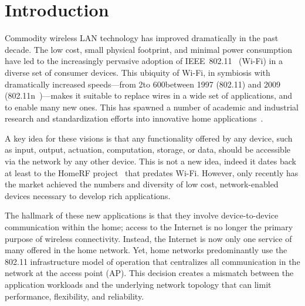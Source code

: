 \section{Introduction}
\label{sec:intro}

Commodity wireless LAN technology has improved dramatically in the past decade. The low cost, small physical footprint, and minimal power consumption have led to the increasingly pervasive adoption of IEEE~802.11~\cite{80211} (Wi-Fi) in a diverse set of consumer devices. This ubiquity of Wi-Fi, in symbiosis with dramatically increased speeds---from 2\Mbps to 600\Mbps between 1997 (802.11) and 2009 (802.11n~\cite{80211n})---makes it suitable to replace wires in a wide set of applications, and to enable many new ones. This has spawned a number of academic and industrial research and standardization efforts into innovative home applications~\cite{dixon_homeos,microsoft_home,wireless_hd,wifi_direct,xxx}.

A key idea for these visions is that any functionality offered by any device, such as input, output, actuation, computation, storage, or data, should be accessible via the network by any other device. This is not a new idea, indeed it dates back at least to the HomeRF project~\cite{nagus_homerf} that predates Wi-Fi. However, only recently has the market achieved the numbers and diversity of low cost, network-enabled devices necessary to develop rich applications.

The hallmark of these new applications is that they involve device-to-device communication within the home;
access to the Internet is no longer the primary purpose of wireless connectivity. Instead, the Internet is now only one service of many offered in the home network. Yet, home networks predominantly use the 802.11 infrastructure model of operation that centralizes all communication in the network at the access point (AP). This decision creates a mismatch between the application workloads and the underlying network topology that can limit performance, flexibility, and reliability.

